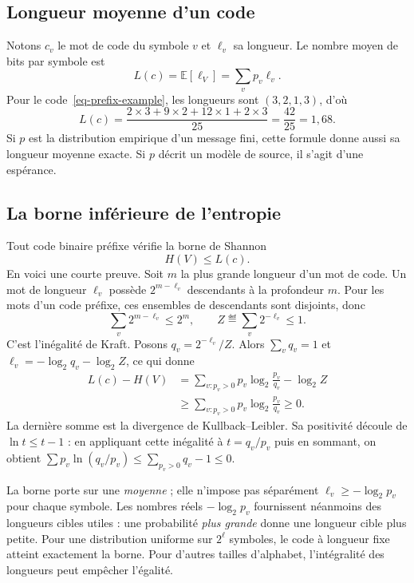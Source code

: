 \subsection{Longueur moyenne d'un code}
Notons $c_v$ le mot de code du symbole $v$ et $\ell_v$ sa longueur. Le nombre moyen de bits par symbole est
\[
 L(c)=\mathbb{E}[\ell_V]=\sum_v p_v\ell_v.
\]
Pour le code~\eqref{eq-prefix-example}, les longueurs sont $(3,2,1,3)$, d'où
\[
 L(c)=\frac{2\times3+9\times2+12\times1+2\times3}{25}
     =\frac{42}{25}=1{,}68.
\]
Si $p$ est la distribution empirique d'un message fini, cette formule donne aussi sa longueur moyenne exacte. Si $p$ décrit un modèle de source, il s'agit d'une espérance.

\subsection{La borne inférieure de l'entropie}
Tout code binaire préfixe vérifie la borne de Shannon~\cite{Shannon1948}
\begin{equation}\label{eq-shannon-bound}
 H(V)\leq L(c).
\end{equation}
En voici une courte preuve. Soit $m$ la plus grande longueur d'un mot de code. Un mot de longueur $\ell_v$ possède $2^{m-\ell_v}$ descendants à la profondeur $m$. Pour les mots d'un code préfixe, ces ensembles de descendants sont disjoints, donc
\[
 \sum_v2^{m-\ell_v}\leq2^m,
 \qquad Z\eqdef\sum_v2^{-\ell_v}\leq1.
\]
C'est l'inégalité de Kraft. Posons $q_v=2^{-\ell_v}/Z$. Alors $\sum_vq_v=1$ et $\ell_v=-\log_2q_v-\log_2Z$, ce qui donne
\[
 \begin{aligned}
 L(c)-H(V)
 &=\sum_{v:p_v>0}p_v\log_2\frac{p_v}{q_v}-\log_2Z\\
 &\geq\sum_{v:p_v>0}p_v\log_2\frac{p_v}{q_v}\geq0.
 \end{aligned}
\]
La dernière somme est la divergence de Kullback--Leibler. Sa positivité découle de $\ln t\leq t-1$ : en appliquant cette inégalité à $t=q_v/p_v$ puis en sommant, on obtient $\sum p_v\ln(q_v/p_v)\leq\sum_{p_v>0}q_v-1\leq0$.

La borne porte sur une \emph{moyenne} ; elle n'impose pas séparément $\ell_v\geq-\log_2p_v$ pour chaque symbole. Les nombres réels $-\log_2p_v$ fournissent néanmoins des longueurs cibles utiles : une probabilité \emph{plus grande} donne une longueur cible plus petite. Pour une distribution uniforme sur $2^\ell$ symboles, le code à longueur fixe atteint exactement la borne. Pour d'autres tailles d'alphabet, l'intégralité des longueurs peut empêcher l'égalité.

